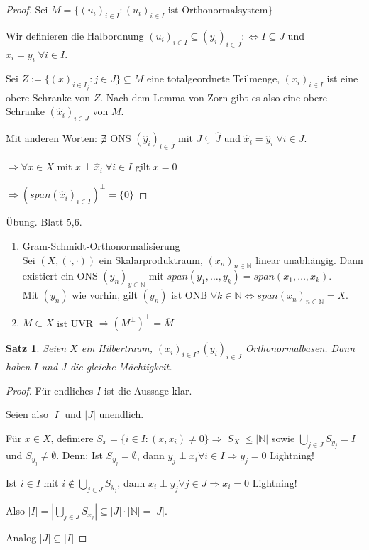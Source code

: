 \documentclass[ngerman]{report}
\theoremstyle{plain}%
\newtheorem{thm}{Satz}[chapter]
\theoremstyle{definition}%
\theoremstyle{myStyle}
\newcommand{\N}{\mathbb{N}}
\newcommand{\df}[1][]{%
	\overset{#1}{\Rightarrow}
}
\newcommand{\aq}{\Leftrightarrow} %
\newcommand{\ff}[3]{(#1_#2)_{#2\in#3}}
\begin{document}
	\begin{proof}
		Sei $M = \{\ff{u}{i}{I} : \ff{u}{i}{I} \text{ ist Orthonormalsystem} \}$ \par
		Wir definieren die Halbordnung $\ff{u}{i}{I} \subseteq \ff{y}{i}{J} :\aq I \subseteq J$ und $x_i = y_i\; \forall i \in I$.\par
		Sei $Z := \{(x)_{i\in I_j} : j\in J \} \subseteq M$ eine totalgeordnete Teilmenge, 
		$\ff{x}{i}{I}$ ist eine obere Schranke von $Z$. Nach dem Lemma von Zorn gibt es also eine obere Schranke $(\hat{x}_i)_{i\in J}$ von $M$. \par
		Mit anderen Worten: $\centernot \exists$ ONS $\ff{\hat{{y}}}{i}{\hat{J}}$ mit $J \subsetneq \hat{J}$ und $\hat{x}_i = \hat{y}_i\; \forall i\in J.$\par
		$\df \forall x\in X$ mit $x\perp \hat{x}_i \;\forall i \in I$ gilt $x= 0$ \par
		$\df (span\ff{\hat{{x}}}{i}{I})^\perp = \{0\}$
	\end{proof}
	Übung. Blatt 5,6.
	\begin{enumerate}
		\item Gram-Schmidt-Orthonormalisierung\\
		Sei $(X, (\cdot,\cdot))$ ein Skalarproduktraum, $(x_n)_{n \in \N}$ linear unabhängig. Dann existiert ein ONS $(y_n)_{y \in \N}$ mit $span(y_1,\dots,y_k)=span(x_1,\dots,x_k)$.\\ Mit $(y_n)$ wie vorhin, gilt $(y_n)$ ist ONB $\forall k \in \N \Leftrightarrow span(x_n)_{n \in \N} = X$.
		\item $M\subset X$ ist UVR $\df (M^{\perp})^{\perp} = \overline{M}$
	\end{enumerate}

	\begin{thm}
		Seien $X$ ein Hilbertraum, $\ff{x}{i}{I}, \ff{y}{i}{J}$ Orthonormalbasen. Dann haben $I$ und $J$ die gleiche Mächtigkeit.
	\end{thm}
	\begin{proof}
		Für endliches $I$ ist die Aussage klar. \par
		Seien also $|I|$ und $|J|$ unendlich.  \par
		Für $x\in X$, definiere $S_x = \{i\in I: (x,x_i) \neq 0\} \df |S_X| \leq |\N|$
		sowie $\bigcup_{j\in J} S_{y_j} = I$ und $S_{y_j} \neq \emptyset$. Denn:
		Ist $S_{y_j} = \emptyset$, dann $y_j \perp x_i \forall i \in I \df y_j =0$ Lightning! \par
		Ist $i\in I$ mit $i \not \in \bigcup_{j\in J} S_{y_j}$, dann $x_i \perp y_j \forall j\in J \df x_i = 0$ Lightning! \par
		Also $|I| = |\bigcup_{j\in J} S_{x_j}| \subseteq |J| \cdot |\N| = |J|$. \par
		Analog $|J| \subseteq |I|$
	\end{proof}
\end{document}
